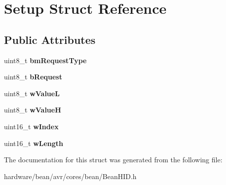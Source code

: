 \hypertarget{struct_setup}{}\section{Setup Struct Reference}
\label{struct_setup}
\subsection*{Public Attributes}
\begin{DoxyCompactItemize}
\item 
\hypertarget{struct_setup_a322e8b6adf8fd22c7cd12b5b9be51b01}{}uint8\+\_\+t {\bfseries bm\+Request\+Type}\label{struct_setup_a322e8b6adf8fd22c7cd12b5b9be51b01}

\item 
\hypertarget{struct_setup_a10cdb0564d101f584e000a4f0a947882}{}uint8\+\_\+t {\bfseries b\+Request}\label{struct_setup_a10cdb0564d101f584e000a4f0a947882}

\item 
\hypertarget{struct_setup_ac91ee6e2a522a8e4aff3928e49b53b36}{}uint8\+\_\+t {\bfseries w\+Value\+L}\label{struct_setup_ac91ee6e2a522a8e4aff3928e49b53b36}

\item 
\hypertarget{struct_setup_a5f69674d80d5f44c478403aca9cbc6f8}{}uint8\+\_\+t {\bfseries w\+Value\+H}\label{struct_setup_a5f69674d80d5f44c478403aca9cbc6f8}

\item 
\hypertarget{struct_setup_a015c4416d6e9c9ec17c44bb4be7ab3fe}{}uint16\+\_\+t {\bfseries w\+Index}\label{struct_setup_a015c4416d6e9c9ec17c44bb4be7ab3fe}

\item 
\hypertarget{struct_setup_adb68ff5b0c66052b34640880edb900bd}{}uint16\+\_\+t {\bfseries w\+Length}\label{struct_setup_adb68ff5b0c66052b34640880edb900bd}

\end{DoxyCompactItemize}


The documentation for this struct was generated from the following file\+:\begin{DoxyCompactItemize}
\item 
hardware/bean/avr/cores/bean/Bean\+H\+I\+D.\+h\end{DoxyCompactItemize}
